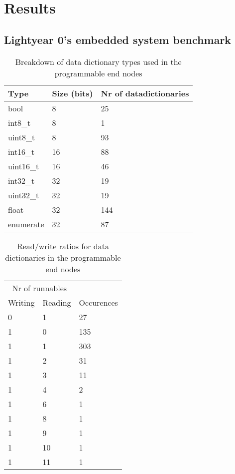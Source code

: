 \section{Results}
\label{sec:results}
\subsection{Lightyear 0's embedded system benchmark}
\label{sec:benchmark}
\begin{table}[htb]
    \centering
    \begin{tabular}{@{}lll@{}}
    \toprule
    Type      & Size (bits) & Nr of datadictionaries \\ \midrule
    bool      & 8           & 25                     \\
    int8\_t   & 8           & 1                      \\
    uint8\_t  & 8           & 93                     \\
    int16\_t  & 16          & 88                     \\
    uint16\_t & 16          & 46                     \\
    int32\_t  & 32          & 19                     \\
    uint32\_t & 32          & 19                     \\
    float     & 32          & 144                    \\
    enumerate & 32          & 87                     \\ \bottomrule
    \end{tabular}
    \caption{Breakdown of data dictionary types used in the programmable end nodes}
    \label{tab:prog_nodes_types}
\end{table}

\begin{table}[htb]
    \centering
    \begin{tabular}{@{}lll@{}}
    \toprule
    \multicolumn{2}{c}{Nr of runnables} & \\
    Writing & Reading & Occurences \\ \midrule
    0       & 1      & 27         \\
    1       & 0      & 135        \\
    1       & 1      & 303        \\
    1       & 2      & 31         \\
    1       & 3      & 11         \\
    1       & 4      & 2          \\
    1       & 6      & 1          \\
    1       & 8      & 1          \\
    1       & 9      & 1          \\
    1       & 10     & 1          \\
    1       & 11     & 1          \\ \bottomrule
    \end{tabular}
    \caption{Read/write ratios for data dictionaries in the programmable end nodes}
    \label{tab:prog_nodes_read_write}
\end{table}

